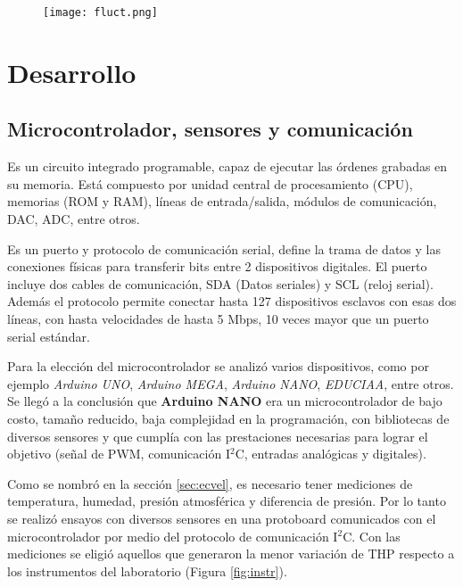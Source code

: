\begin{figure}[h!]
	\centering
	\texttt{[image: fluct.png]}
	\label{fig:fluct}
\end{figure}


\newpage
\section{Desarrollo}  \label{sec:desarr}

\subsection{Microcontrolador, sensores y comunicación}


\begin{tcolorbox}[colback=blue!5!white,colframe=blue!75!black,title=Microcontrolador] Es un circuito integrado programable, capaz de ejecutar las órdenes grabadas en su memoria. Está compuesto por unidad central de procesamiento (CPU), memorias (ROM y RAM), líneas de entrada/salida, módulos de comunicación, DAC, ADC, entre otros.
\end{tcolorbox}

\begin{tcolorbox}[colback=blue!5!white,colframe=blue!75!black,title=I$^2$C]
	Es un puerto y protocolo de comunicación serial, define la trama de datos y las conexiones físicas para transferir bits entre 2 dispositivos digitales. El puerto incluye dos cables de comunicación, SDA (Datos seriales) y SCL (reloj serial). Además el protocolo permite conectar hasta 127 dispositivos esclavos con esas dos líneas, con hasta velocidades de hasta 5 Mbps, 10 veces mayor que un puerto serial estándar. \end{tcolorbox}



	

Para la elección del microcontrolador se analizó varios dispositivos, como por ejemplo \textit{Arduino UNO}, \textit{Arduino MEGA}, \textit{Arduino NANO}, \textit{EDUCIAA}, entre otros. Se llegó a la conclusión que \textbf{Arduino NANO} era un microcontrolador de bajo costo, tamaño reducido, baja complejidad en la programación, con bibliotecas de diversos sensores y que cumplía con las prestaciones necesarias para lograr el objetivo (señal de PWM, comunicación I$^2$C, entradas analógicas y digitales).

Como se nombró en la sección \ref{sec:ecvel}, es necesario tener mediciones de temperatura, humedad, presión atmosférica y diferencia de presión. Por lo tanto se realizó ensayos con diversos sensores en una protoboard comunicados con el microcontrolador por medio del protocolo de comunicación I$^2$C. Con las mediciones se eligió aquellos que generaron la menor variación de THP respecto a los instrumentos del laboratorio (Figura \ref{fig:instr}). 

